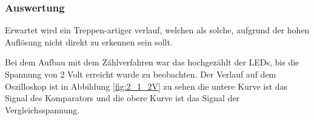 \documentclass[12pt,a4paper]{article}
\begin{document}
\subsubsection*{Auswertung}

Erwartet wird ein Treppen-artiger verlauf, welchen als solche, aufgrund der hohen Auflösung nicht direkt zu erkennen sein sollt. 

Bei dem Aufbau mit dem Zählverfahren war das hochgezählt der LEDs, bis die Spannung von 2 Volt erreicht wurde zu beobachten. Der Verlauf auf dem Oszilloskop ist in Abbildung \ref{fig:2_1_2V} zu sehen die untere Kurve ist das Signal des Komparators und die obere Kurve ist das Signal der Vergleichsspannung.
\end{document}

